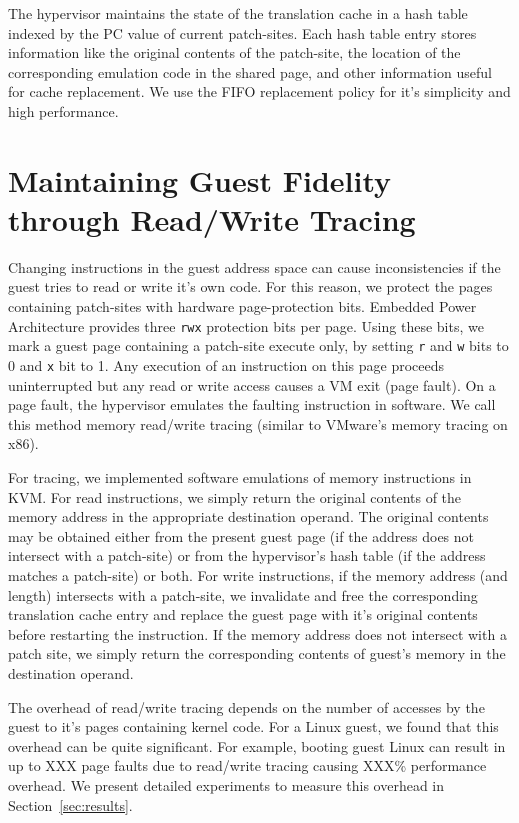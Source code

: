 \documentclass[10pt,twocolumn]{article}
\begin{document}
The hypervisor maintains the state of the translation cache in
a hash table indexed by the PC value of current patch-sites. Each hash table
entry stores information like the original contents of the patch-site,
the location of the corresponding emulation code in the shared page, and other
information useful
for cache replacement. We use the FIFO replacement policy for it's simplicity
and high performance.
\section{Maintaining Guest Fidelity through Read/Write Tracing}
\label{sec:tracing}
Changing instructions in the guest address space can cause
inconsistencies if the guest tries to read or write it's own code.
For this reason, we protect the pages containing patch-sites with hardware
page-protection bits. Embedded Power Architecture provides three {\tt rwx}
protection bits per page. Using these bits, we mark a guest page containing a patch-site
execute only, by setting {\tt r} and {\tt w} bits to 0 and {\tt x} bit to 1.
Any execution of an instruction on this page proceeds uninterrupted
but any read or write access causes a VM exit (page fault).
On a page fault, the hypervisor
emulates the faulting instruction in software. We call this
method memory read/write tracing (similar to VMware's memory tracing
on x86\cite{agesen:comparison}).

For tracing, we implemented software emulations of memory instructions in KVM.
For read instructions, we simply return the original contents of the memory
address in the appropriate destination
operand. The original contents may be obtained either from the present guest
page (if the address does not intersect with a patch-site) or from the hypervisor's
hash table (if the address matches a patch-site) or both.
For write instructions, if the memory address (and length) intersects with a patch-site,
we invalidate and free the corresponding translation cache
entry and replace the guest page with it's original contents before
restarting the instruction. If the memory address does not intersect with a patch
site, we simply return the corresponding contents of guest's memory in the destination
operand.

The overhead of read/write tracing depends on the number of accesses by the guest
to it's pages containing kernel code. For a Linux guest, we found that this overhead
can be quite significant. For example, booting guest Linux can result in
up to XXX page faults due to read/write tracing causing XXX\% performance overhead.
We present detailed experiments to measure this overhead in Section~\ref{sec:results}.
\end{document}
